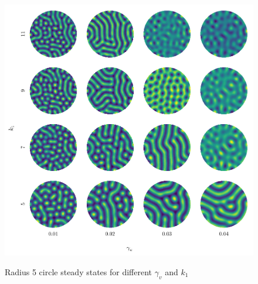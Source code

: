 \begin{figure}[t!]
    \centering
    \caption{Radius 5 circle steady states for different $\gamma_v$ and $k_1$}
    \includegraphics{figures/circle_params.pdf}
    \label{fig:cir-pars}
\end{figure}










